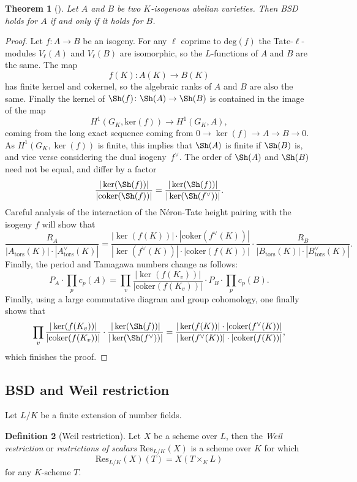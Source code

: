 \documentclass[12pt]{article}
\newtheorem{theorem}{Theorem}[section]
\theoremstyle{definition}
\newtheorem{definition}[theorem]{Definition}
\numberwithin{equation}{subsection}
\begin{document}
\begin{theorem}[\textrm{\cite[Thm.~7.3]{MilneBook}}]
Let $A$ and $B$ be two $K$-isogenous abelian varieties.
Then BSD holds for $A$ if and only if it holds for $B$.
\end{theorem}

\begin{proof}
Let $f \colon A \to B$ be an isogeny.
For any $\ell$ coprime to $\mathrm{deg}(f)$ the Tate-$\ell$-modules $V_\ell(A)$ and $V_\ell(B)$ are isomorphic, so the $L$-functions of $A$ and $B$ are the same.
The map
$$f(K) \colon A(K) \to B(K)$$
has finite kernel and cokernel, so the algebraic ranks of $A$ and $B$ are also the same.
Finally the kernel of $\Sh(f) \colon \Sh(A) \to \Sh(B)$ is contained in the image of the map
$$H^1(G_K, \mathrm{ker}(f)) \to H^1(G_K, A),$$
coming from the long exact sequence coming from $0 \to \ker(f) \to A \to B \to 0$.
As $H^1(G_K, \ker(f))$ is finite, this implies that $\Sh(A)$ is finite if $\Sh(B)$ is, and vice verse considering the dual isogeny~$f^\vee$.
The order of $\Sh(A)$ and $\Sh(B)$ need not be equal, and differ by a factor $$\frac{|\ker(\Sh(f))|}{|\mathrm{coker}(\Sh(f))|} = \frac{|\ker(\Sh(f))|}{|\ker(\Sh(f^\vee))|}.$$
Careful analysis of the interaction of the N\'eron-Tate height pairing with the isogeny $f$ will show that
$$\frac{R_A}{|A_\mathrm{tors}(K)| \cdot |A^\vee_\mathrm{tors}(K)|} = \frac{| \ker(f(K))| \cdot |\mathrm{coker}(f^\vee(K))|}{|\ker(f^\vee(K))| \cdot |\mathrm{coker}(f(K))|} \cdot \frac{R_B}{|B_\mathrm{tors}(K)| \cdot |B^\vee_\mathrm{tors}(K)|}.$$
Finally, the period and Tamagawa numbers change as follows:
$$P_A \cdot \prod_p c_p(A) = \prod_v \frac{|\ker(f(K_v))|}{|\mathrm{coker}(f(K_v))|} \cdot P_B \cdot \prod_p c_p(B).$$
Finally, using a large commutative diagram and group cohomology, one finally shows that 
$$\prod_v \frac{|\ker(f(K_v))|}{|\mathrm{coker}(f(K_v))|} \cdot \frac{|\ker(\Sh(f))|}{|\ker(\Sh(f^\vee))|} = \frac{| \ker(f(K))| \cdot |\mathrm{coker}(f^\vee(K))|}{|\ker(f^\vee(K))| \cdot |\mathrm{coker}(f(K))|},$$
which finishes the proof.
\end{proof}

\subsection{BSD and Weil restriction}

Let $L/K$ be a finite extension of number fields.

\begin{definition}[Weil restriction]
Let $X$ be a scheme over $L$, then the {\em Weil restriction} or {\em restrictions of scalars} $\mathrm{Res}_{L/K}(X)$ is a scheme over $K$ for which $$\mathrm{Res}_{L/K}(X)(T) = X(T \times_K L)$$ for any $K$-scheme $T$.
\end{definition}
\end{document}
